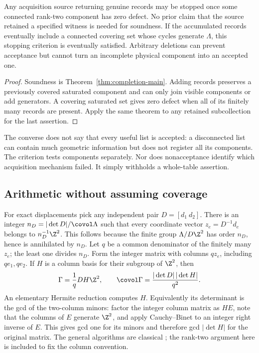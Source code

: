 \begin{corollary}\label{cor:stopping}
Any acquisition source returning genuine records may be stopped once
some connected rank-two component has zero defect. No prior claim
that the source retained a specified witness is needed for soundness.
If the accumulated records eventually include a connected covering set
whose cycles generate $\Lambda$, this stopping criterion is eventually
satisfied. Arbitrary deletions can prevent acceptance but cannot turn
an incomplete physical component into an accepted one.
\end{corollary}
\begin{proof}
Soundness is Theorem~\ref{thm:completion-main}. Adding records preserves
a previously covered saturated component and can only join visible
components or add generators. A covering saturated set gives zero
defect when all of its finitely many records are present. Apply the same
theorem to any retained subcollection for the last assertion.
\end{proof}

The converse does not say that every useful list is accepted: a disconnected
list can contain much geometric information but does not register all
its components. The criterion tests components separately. Nor does
nonacceptance identify which acquisition mechanism failed. It simply
withholds a whole-table assertion.

\subsection{Arithmetic without assuming coverage}
For exact displacements pick any independent pair $D=[d_1\ d_2]$.
There is an integer $n_D=|\det D|/\covol\Lambda$ such that every
coordinate vector $z_e=D^{-1}d_e$ belongs to $n_D^{-1}\Z^2$.
This follows because the finite group $\Lambda/D\Z^2$ has order
$n_D$, hence is annihilated by $n_D$. Let $q$ be a common denominator
of the finitely many $z_e$; the least one divides $n_D$. Form the
integer matrix with columns $qz_e$, including $qe_1,qe_2$. If $H$
is a column basis for their subgroup of $\Z^2$, then
\begin{equation}\label{eq:denominator-group}
 \Gamma=\frac1qDH\Z^2,\qquad
 \covol\Gamma=\frac{|\det D|\,|\det H|}{q^2}.
\end{equation}
An elementary Hermite reduction computes $H$. Equivalently its determinant
is the gcd of the two-column minors: factor the integer column matrix
as $HE$, note that the columns of $E$ generate $\Z^2$, and apply
Cauchy--Binet to an integer right inverse of $E$. This gives gcd one
for its minors and therefore gcd $|\det H|$ for the original matrix.
The general algorithms are classical \cite{KB}; the rank-two argument
here is included to fix the column convention.

